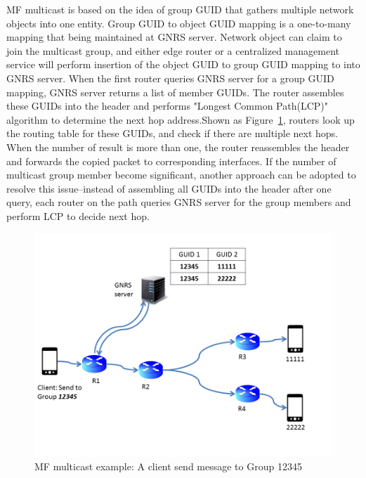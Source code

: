 \vspace{1mm}MF multicast is based on the idea of group GUID that gathers multiple network objects into one entity. Group GUID  to object GUID mapping is a one-to-many mapping that being maintained at GNRS server. Network object can claim to join the multicast group, and either edge router or a centralized management service will perform insertion of the object GUID to group GUID mapping to into GNRS server. When the first router queries GNRS server for a group GUID mapping, GNRS server returns a list of member GUIDs. The router assembles these GUIDs into the header and performs "Longest Common Path(LCP)" algorithm to determine the next hop address.Shown as Figure~\ref{fig:multicast}, routers look up the routing table for these GUIDs, and check if there are multiple next hops. When the number of result is more than one, the router reassembles the header and forwards the copied packet to corresponding interfaces. If the number of multicast group member become significant, another approach can be adopted to resolve this issue--instead of assembling all GUIDs into the header after one query, each router on the path queries GNRS server for the group members and perform LCP to decide next hop.
\begin{figure}
\centering
\includegraphics[width=\columnwidth]{figure/multicast.png}
\caption{\label{fig:multicast}MF multicast example: A client send message to Group 12345}
\end{figure}  